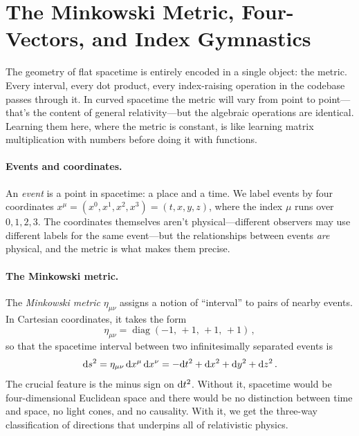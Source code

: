 \section{The Minkowski Metric, Four-Vectors, and Index Gymnastics}
\label{sec:sr-minkowski}

The geometry of flat spacetime is entirely encoded in a single object: the
metric.  Every interval, every dot product, every index-raising operation in
the codebase passes through it.  In curved spacetime the metric will vary from
point to point---that's the content of general relativity---but the algebraic
operations are identical.  Learning them here, where the metric is constant, is
like learning matrix multiplication with numbers before doing it with
functions.

\paragraph{Events and coordinates.}

An \emph{event} is a point in spacetime: a place and a time.  We label events
by four coordinates $x^\mu = (x^0, x^1, x^2, x^3) = (t, x, y, z)$, where the
index $\mu$ runs over $0, 1, 2, 3$.
The coordinates themselves aren't physical---different observers may use
different labels for the same event---but the relationships between events
\emph{are} physical, and the metric is what makes them precise.

\paragraph{The Minkowski metric.}

The \emph{Minkowski metric} $\eta_{\mu\nu}$ assigns a notion of ``interval''
to pairs of nearby events.  In Cartesian coordinates, it takes the form
%
\begin{equation}
  \eta_{\mu\nu}
    = \operatorname{diag}(-1,\, +1,\, +1,\, +1) \,,
  \label{eq:minkowski-metric}
\end{equation}
%
so that the spacetime interval between two infinitesimally separated events is
%
\begin{equation}
  \mathrm{d} s^2
    = \eta_{\mu\nu}\,\mathrm{d} x^\mu\,\mathrm{d} x^\nu
    = -\mathrm{d} t^2 + \mathrm{d} x^2 + \mathrm{d} y^2 + \mathrm{d} z^2 \,.
  \label{eq:minkowski-interval}
\end{equation}
%
The crucial feature is the minus sign on $\mathrm{d} t^2$.  Without it, spacetime would
be four-dimensional Euclidean space and there would be no distinction between
time and space, no light cones, and no causality.  With it, we get the
three-way classification of directions that underpins all of relativistic
physics.

